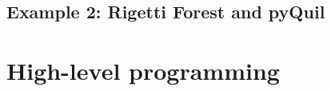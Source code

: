 \documentclass{beamer}
\begin{document}
\begin{frame}{\insertsection}{\insertsubsection}
	
\end{frame}

\begin{frame}{\insertsection}{\insertsubsection}
	
\end{frame}

\begin{frame}{\insertsection}{\insertsubsection}
	
\end{frame}


\subsection{Example 2: Rigetti Forest and pyQuil}

\begin{frame}{\insertsection}{\insertsubsection}
	
\end{frame}

\begin{frame}{\insertsection}{\insertsubsection}
	
\end{frame}

\begin{frame}{\insertsection}{\insertsubsection}
	
\end{frame}

\begin{frame}{\insertsection}{\insertsubsection}
	
\end{frame}

\section{High-level programming}
\end{document}
